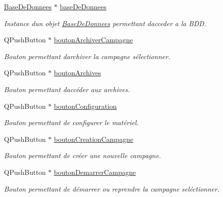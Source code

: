 \begin{DoxyCompactItemize}
\item 
\hyperlink{class_base_de_donnees}{Base\+De\+Donnees} $\ast$ \hyperlink{class_i_h_m_accueil_ab56d9846c071396a92f88272880e2c1f}{base\+De\+Donnees}
\begin{DoxyCompactList}\small\item\em Instance d\textquotesingle{}un objet \hyperlink{class_base_de_donnees}{Base\+De\+Donnees} permettant d\textquotesingle{}acceder a la B\+DD. \end{DoxyCompactList}\item 
Q\+Push\+Button $\ast$ \hyperlink{class_i_h_m_accueil_a96d64cf254c0645eb45c317858b0a0f3}{bouton\+Archiver\+Campagne}
\begin{DoxyCompactList}\small\item\em Bouton permettant d\textquotesingle{}archiver la campagne sélectionner. \end{DoxyCompactList}\item 
Q\+Push\+Button $\ast$ \hyperlink{class_i_h_m_accueil_a313a8c52763aa2978010db77ec6673ac}{bouton\+Archives}
\begin{DoxyCompactList}\small\item\em Bouton permettant d\textquotesingle{}accéder aux archives. \end{DoxyCompactList}\item 
Q\+Push\+Button $\ast$ \hyperlink{class_i_h_m_accueil_a8b8ed7d11ab66e3c6895b3c6129dc9c8}{bouton\+Configuration}
\begin{DoxyCompactList}\small\item\em Bouton permettant de configurer le matériel. \end{DoxyCompactList}\item 
Q\+Push\+Button $\ast$ \hyperlink{class_i_h_m_accueil_a4186b4ef6a9c63f5b3c6431626ff3268}{bouton\+Creation\+Campagne}
\begin{DoxyCompactList}\small\item\em Bouton permettant de créer une nouvelle campagne. \end{DoxyCompactList}\item 
Q\+Push\+Button $\ast$ \hyperlink{class_i_h_m_accueil_a9fd8ab3abc0c1e6addd70c8d7c46fb65}{bouton\+Demarrer\+Campagne}
\begin{DoxyCompactList}\small\item\em Bouton permettant de démarrer ou reprendre la campagne seléctionner. \end{DoxyCompactList}\item 

\end{DoxyCompactItemize}
